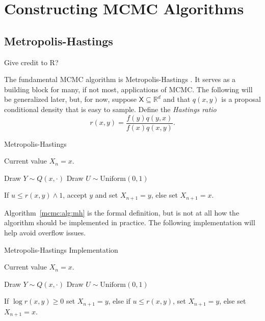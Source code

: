 \documentclass[12pt]{article}
\theoremstyle{plain}
\theoremstyle{definition}
\theoremstyle{remark}
\newcommand{\X}{\mathsf{X}}
\newcommand{\real}{\mathbb{R}}
\begin{document}
 
 
\section{Constructing MCMC Algorithms}
\label{mcmc:sec:construct}

\subsection{Metropolis-Hastings}
\label{mcmc:sec:mh}

{\color{blue} Give credit to R?}

The fundamental MCMC algorithm is Metropolis-Hastings \cite{hast:1970,
  metr:1953}.  It serves as a building block for many, if not most,
applications of MCMC.  The following will be generalized later, but,
for now, suppose $\X \subseteq \real^d$ and that $q(x,y)$ is a
proposal conditional density that is easy to sample.
Define the {\em Hastings ratio}
\[
r(x,y) = \frac{f(y)q(y,x)}{f(x)q(x, y)} .
\]

\begin{algorithm}[H]
 \caption{Metropolis-Hastings} \label{mcmc:alg:mh}
 \begin{algorithmic}[1]
    Current value $X_n = x$.

   \State Draw $Y \sim Q(x, \cdot)$ \State Draw
   $U \sim \text{Uniform}(0,1)$
   
   \State If $u \le r(x,y) \wedge 1$, accept $y$ and set $X_{n+1}= y$,
   else set $X_{n+1} = x$.
 \end{algorithmic}
\end{algorithm}

Algorithm~\ref{mcmc:alg:mh} is the formal definition, but is not at
all how the algorithm should be implemented in practice.  The
following implementation will help avoid overflow issues.

\begin{algorithm}[H]
 \caption{Metropolis-Hastings Implementation} \label{mcmc:alg:mh}
 \begin{algorithmic}[1]
    Current value $X_n = x$.

   \State Draw $Y \sim Q(x, \cdot)$ \State Draw
   $U \sim \text{Uniform}(0,1)$

   \State If $\log r(x,y) \ge 0$ set $X_{n+1}= y$, else if $u \le
   r(x,y)$, set $X_{n+1}= y$, else set $X_{n+1} = x$.
 \end{algorithmic}
\end{algorithm}
\end{document}
